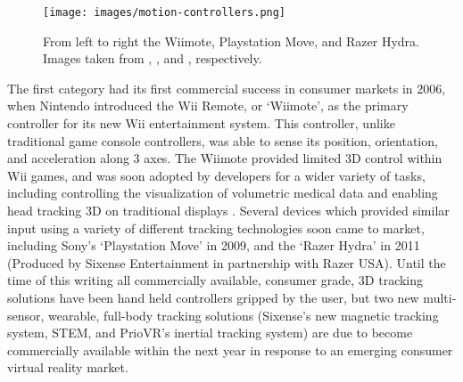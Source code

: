 \begin{figure}[ht!]
\centering
\texttt{[image: images/motion-controllers.png]}
\caption{From left to right the Wiimote, Playstation Move, and Razer Hydra. Images taken from \protect\cite{wiimote-image}, \protect\cite{ps-move-image}, and \protect\cite{hydra-image}, respectively.}
\label{fig:motion-controllers}
\end{figure}

The first category had its first commercial success in consumer markets in 2006, when Nintendo introduced the Wii Remote, or `Wiimote', as the primary controller for its new Wii entertainment system. This controller, unlike traditional game console controllers, was able to sense its position, orientation, and acceleration along 3 axes. The Wiimote provided limited 3D control within Wii games, and was soon adopted by developers for a wider variety of tasks, including controlling the visualization of volumetric medical data \cite{wiimote-medical} and enabling head tracking 3D on traditional displays \cite{hacking-the-wiimote}. Several devices which provided similar input using a variety of different tracking technologies soon came to market, including Sony's `Playstation Move' in 2009, and the `Razer Hydra' in 2011 (Produced by Sixense Entertainment in partnership with Razer USA). Until the time of this writing all commercially available, consumer grade, 3D tracking solutions have been hand held controllers gripped by the user, but two new multi-sensor, wearable, full-body tracking solutions (Sixense's new magnetic tracking system, STEM, and PrioVR's inertial tracking system) are due to become commercially available within the next year in response to an emerging consumer virtual reality market.
 
